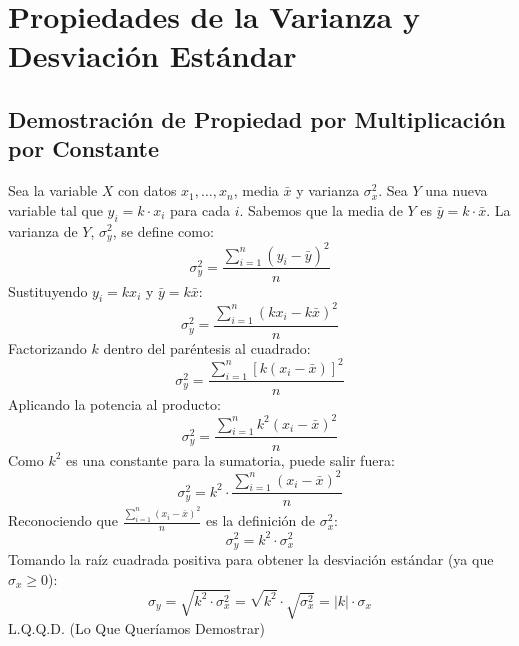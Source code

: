 \documentclass[12pt, letterpaper]{article}
\begin{document}
\section{Propiedades de la Varianza y Desviación Estándar}
\subsection{Demostración de Propiedad por Multiplicación por Constante}
Sea la variable $X$ con datos $x_1, \dots, x_n$, media $\bar{x}$ y varianza $\sigma_x^2$.
Sea $Y$ una nueva variable tal que $y_i = k \cdot x_i$ para cada $i$.
Sabemos que la media de $Y$ es $\bar{y} = k \cdot \bar{x}$.
La varianza de $Y$, $\sigma_y^2$, se define como:
\[\sigma_y^2=\frac{\sum_{i=1}^{n} (y_i - \bar{y})^2}{n} \]
Sustituyendo $y_i = kx_i$ y $\bar{y} = k\bar{x}$:
\[\sigma_y^2=\frac{\sum_{i=1}^{n} (kx_i - k\bar{x})^2}{n}\]
Factorizando $k$ dentro del paréntesis al cuadrado:
\[\sigma_y^2=\frac{\sum_{i=1}^{n} [k(x_i - \bar{x})]^2}{n}\]
Aplicando la potencia al producto:
\[\sigma_y^2=\frac{\sum_{i=1}^{n} k^2(x_i - \bar{x})^2}{n}\]
Como $k^2$ es una constante para la sumatoria, puede salir fuera:
\[\sigma_y^2=k^2 \cdot \frac{\sum_{i=1}^{n} (x_i - \bar{x})^2}{n}\]
Reconociendo que $\frac{\sum_{i=1}^{n} (x_i - \bar{x})^2}{n}$ es la definición de $\sigma_x^2$:
\[\sigma_y^2=k^2 \cdot \sigma_x^2\]
Tomando la raíz cuadrada positiva para obtener la desviación estándar (ya que $\sigma_x \ge 0$):
\[\sigma_y = \sqrt{k^2 \cdot \sigma_x^2} = \sqrt{k^2} \cdot \sqrt{\sigma_x^2} = |k| \cdot \sigma_x\]
L.Q.Q.D. (Lo Que Queríamos Demostrar)
\end{document}
